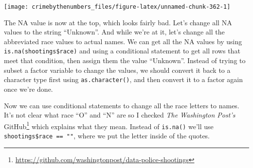\documentclass[
  a4paper,
]{krantz}
\makeatletter
\newenvironment{Shaded}{\begin{snugshade}}{\end{snugshade}}
\newcommand{\FunctionTok}[1]{\textcolor[rgb]{0,0,0}{#1}}
\newcommand{\NormalTok}[1]{#1}
\newcommand{\OtherTok}[1]{\textcolor[rgb]{0.37,0.37,0.37}{#1}}
\newcommand{\SpecialCharTok}[1]{\textcolor[rgb]{0,0,0}{#1}}
\newcommand{\StringTok}[1]{\textcolor[rgb]{0.5,0.5,0.5}{#1}}
\renewcommand{\href}[2]{#2\footnote{\url{#1}}}
\newenvironment{kframe}{%
\medskip{}
\setlength{\fboxsep}{.8em}
 \def\at@end@of@kframe{}%
 \ifinner\ifhmode%
  \def\at@end@of@kframe{\end{minipage}}%
  \begin{minipage}{\columnwidth}%
 \fi\fi%
 \def\FrameCommand##1{\hskip\@totalleftmargin \hskip-\fboxsep
 \colorbox{shadecolor}{##1}\hskip-\fboxsep
     \hskip-\linewidth \hskip-\@totalleftmargin \hskip\columnwidth}%
 \MakeFramed {\advance\hsize-\width
   \@totalleftmargin\z@ \linewidth\hsize
   \@setminipage}}%
 {\par\unskip\endMakeFramed%
 \at@end@of@kframe}
\renewenvironment{Shaded}{\begin{kframe}}{\end{kframe}}
\makeatother
\begin{document}
\begin{center}\texttt{[image: crimebythenumbers\_files/figure-latex/unnamed-chunk-362-1]} \end{center}

The NA value is now at the top, which looks fairly bad.
Let's change all NA values to the string ``Unknown''. And
while we're at it, let's change all the abbreviated race
values to actual names. We can get all the NA values by
using \texttt{is.na(shootings\$race)} and using a
conditional statement to get all rows that meet that
condition, then assign them the value ``Unknown''. Instead
of trying to subset a factor variable to change the values,
we should convert it back to a character type first using
\texttt{as.character()}, and then convert it to a factor
again once we're done.

\begin{Shaded}
\end{Shaded}

Now we can use conditional statements to change all the race
letters to names. It's not clear what race ``O'' and ``N''
are so I checked
\href{https://github.com/washingtonpost/data-police-shootings}{\emph{The
Washington Post's} GitHub} which explains what they mean.
Instead of \texttt{is.na()} we'll use
\texttt{shootings\$race\ ==\ ""}, where we put the letter
inside of the quotes.

\begin{Shaded}
\end{Shaded}
\end{document}
